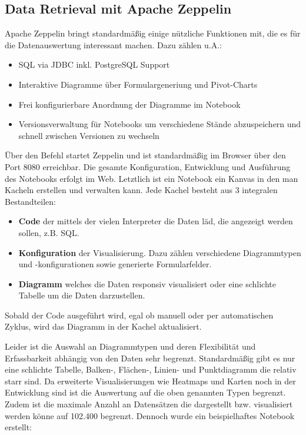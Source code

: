 \subsection{Data Retrieval mit Apache Zeppelin}\label{subsec:zeppelin}
Apache Zeppelin bringt standardmäßig einige nützliche Funktionen mit, die es für die Datenauswertung interessant machen. Dazu zählen u.A.:
\begin{itemize}
	\item SQL via JDBC inkl. PostgreSQL Support
	\item Interaktive Diagramme über Formulargeneriung und Pivot-Charts
	\item Frei konfigurierbare Anordnung der Diagramme im Notebook
	\item Versionsverwaltung für Notebooks um verschiedene Stände abzuspeichern und schnell zwischen Versionen zu wechseln
\end{itemize}

Über den Befehl  startet Zeppelin und ist standardmäßig im Browser über den Port 8080 erreichbar. Die gesamte Konfiguration, Entwicklung und Ausführung des Notebooks erfolgt im Web. Letztlich ist ein Notebook ein Kanvas in den man Kacheln erstellen und verwalten kann. Jede Kachel besteht aus 3 integralen Bestandteilen:
\begin{itemize}
	\item \textbf{Code} der mittels der vielen Interpreter die Daten läd, die angezeigt werden sollen, z.B. SQL.
	\item \textbf{Konfiguration} der Visualisierung. Dazu zählen verschiedene Diagrammtypen und -konfigurationen sowie generierte Formularfelder. 
	\item \textbf{Diagramm} welches die Daten responsiv visualisiert oder eine schlichte Tabelle um die Daten darzustellen.
\end{itemize}

Sobald der Code ausgeführt wird, egal ob manuell oder per automatischen Zyklus, wird das Diagramm in der Kachel aktualisiert.


Leider ist die Auswahl an Diagrammtypen und deren Flexibilität und Erfassbarkeit abhängig von den Daten sehr begrenzt. Standardmäßig gibt es nur eine schlichte Tabelle, Balken-, Flächen-, Linien- und Punktdiagramm die relativ starr sind. Da erweiterte Visualisierungen wie Heatmaps und Karten noch in der Entwicklung sind ist die Auswertung auf die oben genannten Typen begrenzt. Zudem ist die maximale Anzahl an Datensätzen die dargestellt bzw. visualisiert werden könne auf 102.400 begrenzt. Dennoch wurde ein beispielhaftes Notebook erstellt:

